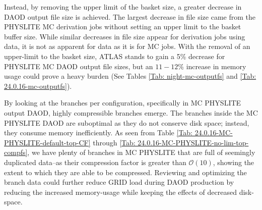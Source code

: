 Instead, by removing the upper limit of the basket size, a greater decrease in DAOD output file size is achieved. 
The largest decrease in file size came from the PHYSLITE MC derivation jobs without setting an upper limit to the basket buffer size. 
While similar decreases in file size appear for derivation jobs using data, it is not as apparent for data as it is for MC jobs. 
With the removal of an upper-limit to the basket size, ATLAS stands to gain a 5\% decrease for PHYSLITE MC DAOD output file sizes, but an $11 - 12$\% increase in memory usage could prove a heavy burden (See Tables \ref{Tab: night-mc-outputfs} and \ref{Tab: 24.0.16-mc-outputfs}).

By looking at the branches per configuration, specifically in MC PHYSLITE output DAOD, highly compressible branches emerge. 
The branches inside the MC PHYSLITE DAOD are suboptimal as they do not conserve disk space; instead, they consume memory inefficiently. 
As seen from Table \ref{Tab: 24.0.16-MC-PHYSLITE-default-top-CF} through \ref{Tab: 24.0.16-MC-PHYSLITE-no-lim-top-compfs}, we have plenty of branches in MC PHYSLITE that are full of seemingly duplicated data--as their compression factor is greater than $\mathcal{O}(10)$, showing the extent to which they are able to be compressed. 
Reviewing and optimizing the branch data could further reduce GRID load during DAOD production by reducing the increased memory-usage while keeping the effects of decreased disk-space. 
